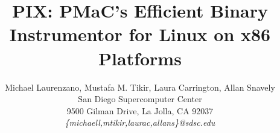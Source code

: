 \documentclass[a4paper,11pt,leqno,notitlepage,onecolumn]{article}
\begin{document}
\title{PIX: PMaC's Efficient Binary Instrumentor for Linux on x86 Platforms}
\author{Michael Laurenzano, Mustafa M. Tikir, Laura Carrington, Allan Snavely\\
San Diego Supercomputer Center\\
9500 Gilman Drive, La Jolla, CA 92037\\
\it{\{michaell,mtikir,laurac,allans\}@sdsc.edu}}
\date{}
\maketitle

\begin{abstract}

\end{abstract}

\label{Section:Introduction}


\label{Section:Overview}


\label{Section:Efficiency}


\label{Section:Results}


\label{Section:Future}


\label{Section:Conclusions}




\end{document}
